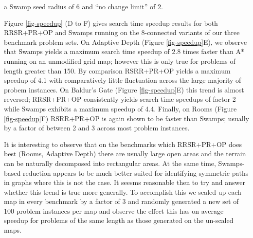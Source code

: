  a Swamp seed radius of 6 and ``no change limit'' of 2.
\par
Figure \ref{fig-speedup} (D to F) gives search time speedup results for both 
RRSR+PR+OP and Swamps running on the 8-connected variants of our three benchmark 
problem sets. 
On Adaptive Depth (Figure \ref{fig-speedup}E), we observe that 
Swamps yields a maximum search time speedup of 2.8 times faster than 
 A* running on an unmodified grid map; however this is only true for problems of length greater than 150.
By comparison RSRR+PR+OP yields a maximum speedup of 4.1 with comparatively little fluctuation across the
large majority of probem instances.
On Baldur's Gate (Figure \ref{fig-speedup}E) this trend is almost reversed; RRSR+PR+OP consistently 
yields search time speedups of factor 2 while Swamps exhibits a maximum speedup of 4.4.
Finally, on Rooms (Figure \ref{fig-speedup}F) RSRR+PR+OP is again shown to be faster than Swamps;
usually by a factor of between 2 and 3 across most problem instances.
\par
It is interesting to observe that on the benchmarks which RRSR+PR+OP does best (Rooms, Adaptive Depth) 
there are usually large open areas and the terrain can be naturally decomposed into rectangular areas. 
At the same time, Swamps-based reduction appears to be much better suited for identifying symmetric paths 
in graphs where this is not the case.
It seesms reasonable then to try and answer whether this trend is true more generally.
To accomplish this we scaled up each map in every benchmark by a factor of 3 and randomly generated a new
set of 100 problem instances per map and observe the effect this has on average speedup for problems of the 
same length as those generated on the un-scaled maps.




